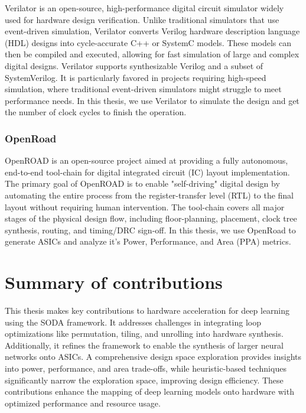 Verilator  \cite{wilson2023verilator} is an open-source, high-performance digital circuit simulator widely used for hardware design verification. Unlike traditional simulators that use event-driven simulation, Verilator converts Verilog hardware description language (HDL) designs into cycle-accurate C++ or SystemC models. These models can then be compiled and executed, allowing for fast simulation of large and complex digital designs. Verilator supports synthesizable Verilog and a subset of SystemVerilog. It is particularly favored in projects requiring high-speed simulation, where traditional event-driven simulators might struggle to meet performance needs. In this thesis, we use Verilator to simulate the design and get the number of clock cycles to finish the operation.

\subsubsection{OpenRoad}

OpenROAD \cite{ajayi2019openroad} is an open-source project aimed at providing a fully autonomous, end-to-end tool-chain for digital integrated circuit (IC) layout implementation. The primary goal of OpenROAD is to enable "self-driving" digital design by automating the entire process from the register-transfer level (RTL) to the final layout without requiring human intervention. The tool-chain covers all major stages of the physical design flow, including floor-planning, placement, clock tree synthesis, routing, and timing/DRC sign-off. In this thesis, we use OpenRoad to generate ASICs and analyze it's Power, Performance, and Area (PPA) metrics.


\section{Summary of contributions}

This thesis makes key contributions to hardware acceleration for deep learning using the SODA framework. It addresses challenges in integrating loop optimizations like permutation, tiling, and unrolling into hardware synthesis. Additionally, it refines the framework to enable the synthesis of larger neural networks onto ASICs. A comprehensive design space exploration provides insights into power, performance, and area trade-offs, while heuristic-based techniques significantly narrow the exploration space, improving design efficiency. These contributions enhance the mapping of deep learning models onto hardware with optimized performance and resource usage.

